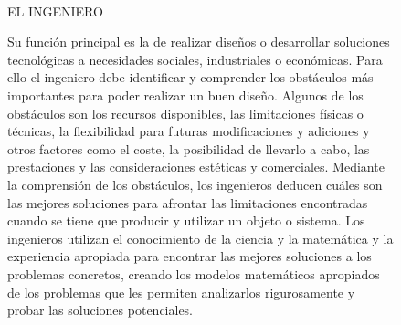 \documentclass[12pt]{article}
\begin{document}
\begin{figure}[ht]
\begin{minipage}{0.3 \textwidth}
\end{minipage}
\ \
\hfill \begin{minipage}{0.3 \textwidth}%
\begin{center}
EL INGENIERO
\end{center}
Su función principal es la de realizar diseños o desarrollar soluciones tecnológicas a necesidades sociales, industriales o económicas. Para 
ello el ingeniero debe identificar y comprender los obstáculos más importantes para poder realizar un buen diseño. Algunos de los obstáculos 
son los recursos disponibles, las limitaciones físicas o técnicas, la flexibilidad para futuras modificaciones y adiciones y otros factores 
como el coste, la posibilidad de llevarlo a cabo, las prestaciones y las consideraciones estéticas y comerciales. Mediante la comprensión de 
los obstáculos, los ingenieros deducen cuáles son las mejores soluciones para afrontar las limitaciones encontradas cuando se tiene que 
producir y utilizar un objeto o sistema.
Los ingenieros utilizan el conocimiento de la ciencia y la matemática y la experiencia apropiada para encontrar las mejores soluciones a los 
problemas concretos, creando los modelos matemáticos apropiados de los problemas que les permiten analizarlos rigurosamente y probar las 
soluciones potenciales. 
\end{minipage}
\end{figure}
\end{document}
